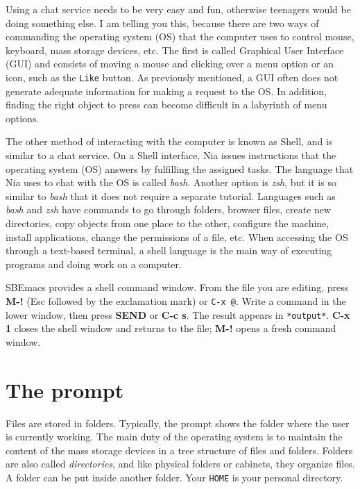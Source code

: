 \documentclass[
  12pt,
]{book}
\begin{document}
Using a chat service needs to be very easy and fun, otherwise teenagers
would be doing something else. I am telling you this, because there are
two ways of commanding the operating system (OS) that the computer uses
to control mouse, keyboard, mass storage devices, etc. The first is
called Graphical User Interface (GUI) and consists of moving a mouse and
clicking over a menu option or an icon, such as the \texttt{Like}
button. As previously mentioned, a GUI often does not generate adequate
information for making a request to the OS. In addition, finding the
right object to press can become difficult in a labyrinth of menu
options.

The other method of interacting with the computer is known as Shell, and
is similar to a chat service. On a Shell interface, Nia issues
instructions that the operating system (OS) answers by fulfilling the
assigned tasks. The language that Nia uses to chat with the OS is called
\emph{bash}. Another option is \emph{zsh}, but it is so similar to
\emph{bash} that it does not require a separate tutorial. Languages such
as \emph{bash} and \emph{zsh} have commands to go through folders,
browser files, create new directories, copy objects from one place to
the other, configure the machine, install applications, change the
permissions of a file, etc. When accessing the OS through a text-based
terminal, a shell language is the main way of executing programs and
doing work on a computer.

SBEmacs provides a shell command window. From the file you are editing,
press \textbf{M-!} (Esc followed by the exclamation mark) or
\texttt{C-x\ @}. Write a command in the lower window, then press
\textbf{SEND} or \textbf{C-c s}. The result appears in
\texttt{*output*}. \textbf{C-x 1} closes the shell window and returns to
the file; \textbf{M-!} opens a fresh command window.

\section*{The prompt}\label{The}

Files are stored in folders. Typically, the prompt shows the folder
where the user is currently working. The main duty of the operating
system is to maintain the content of the mass storage devices in a tree
structure of files and folders. Folders are also called
\emph{directories}, and like physical folders or cabinets, they organize
files. A folder can be put inside another folder. Your \texttt{HOME} is
your personal directory.
\end{document}
